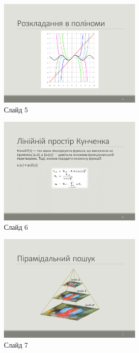 \documentclass{thesis_utf8}
\begin{document}
\begin{figure}[h]
    \centering
    \includegraphics[width=0.63\textwidth]{slides/slide05.png}
    \caption{Слайд 5}
\end{figure}

\begin{figure}[h]
    \centering
    \includegraphics[width=0.63\textwidth]{slides/slide06.png}
    \caption{Слайд 6}
\end{figure}

\begin{figure}[h]
    \centering
    \includegraphics[width=0.63\textwidth]{slides/slide07.png}
    \caption{Слайд 7}
\end{figure}
\end{document}

